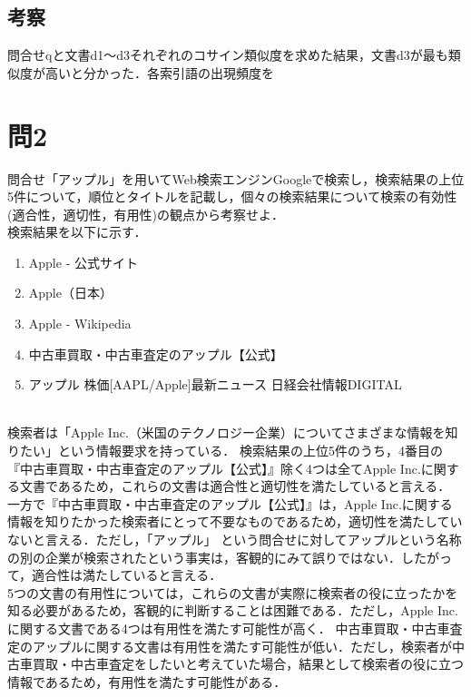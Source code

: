 \documentclass[dvipdfmx,autodetect-engine,titlepage]{jsarticle}
\begin{document}
\subsection{考察}
問合せqと文書d1〜d3それぞれのコサイン類似度を求めた結果，文書d3が最も類似度が高いと分かった．各索引語の出現頻度を


\section{問2}
問合せ「アップル」を用いてWeb検索エンジンGoogleで検索し，検索結果の上位5件について，順位とタイトルを記載し，個々の検索結果について検索の有効性(適合性，適切性，有用性)の観点から考察せよ．\\

検索結果を以下に示す．
\begin{enumerate}
  \item Apple - 公式サイト
  \item Apple（日本）
  \item Apple - Wikipedia
  \item 中古車買取・中古車査定のアップル【公式】
  \item アップル 株価[AAPL/Apple]最新ニュース 日経会社情報DIGITAL
\end{enumerate}
　\\
検索者は「Apple Inc.（米国のテクノロジー企業）についてさまざまな情報を知りたい」という情報要求を持っている．
検索結果の上位5件のうち，4番目の『中古車買取・中古車査定のアップル【公式】』除く4つは全てApple Inc.に関する文書であるため，これらの文書は適合性と適切性を満たしていると言える．\\
一方で『中古車買取・中古車査定のアップル【公式】』は，Apple Inc.に関する情報を知りたかった検索者にとって不要なものであるため，適切性を満たしていないと言える．ただし，「アップル」
という問合せに対してアップルという名称の別の企業が検索されたという事実は，客観的にみて誤りではない．したがって，適合性は満たしていると言える．\\
5つの文書の有用性については，これらの文書が実際に検索者の役に立ったかを知る必要があるため，客観的に判断することは困難である．ただし，Apple Inc.に関する文書である4つは有用性を満たす可能性が高く．
中古車買取・中古車査定のアップルに関する文書は有用性を満たす可能性が低い．ただし，検索者が中古車買取・中古車査定をしたいと考えていた場合，結果として検索者の役に立つ情報であるため，有用性を満たす可能性がある．
\end{document}
